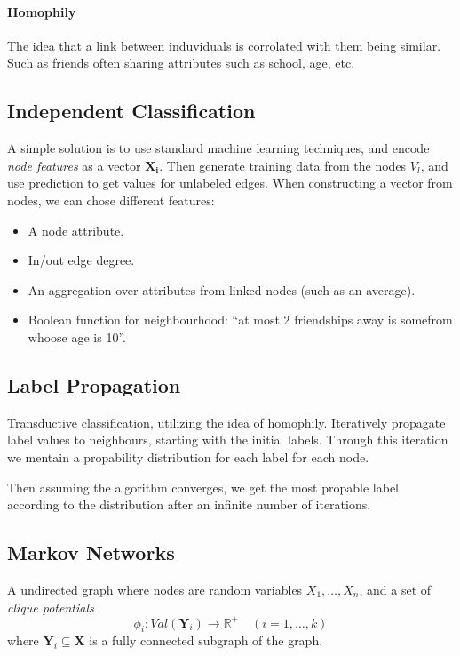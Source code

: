 \paragraph{Homophily} The idea that a link between induviduals is corrolated with them being similar.
Such as friends often sharing attributes such as school, age, etc.

\subsection{Independent Classification}
A simple solution is to use standard machine learning techniques, and encode \emph{node features} as a vector $\mathbf{X_i}$.
Then generate training data from the nodes $V_l$, and use prediction to get values for unlabeled edges.
When constructing a vector from nodes, we can chose different features:
\begin{itemize}
    \item A node attribute.
    \item In/out edge degree.
    \item An aggregation over attributes from linked nodes (such as an average).
    \item Boolean function for neighbourhood: ``at most 2 friendships away is somefrom whoose age is 10''.
\end{itemize}

\subsection{Label Propagation}

Transductive classification, utilizing the idea of homophily.
Iteratively propagate label values to neighbours, starting with the initial labels.
Through this iteration we mentain a propability distribution for each label for each node.

Then assuming the algorithm converges, we get the most propable label according to the distribution after an infinite number of iterations.

\subsection{Markov Networks}

A undirected graph where nodes are random variables $X_1, \dots, X_n$, and a set of \emph{clique potentials}
\[
    \phi_i : Val(\mathbf{Y}_i) \rightarrow \mathbb{R}^+ \quad (i = 1, \dots, k)
\]
where $\mathbf{Y}_i \subseteq \mathbf{X}$ is a fully connected subgraph of the graph.

